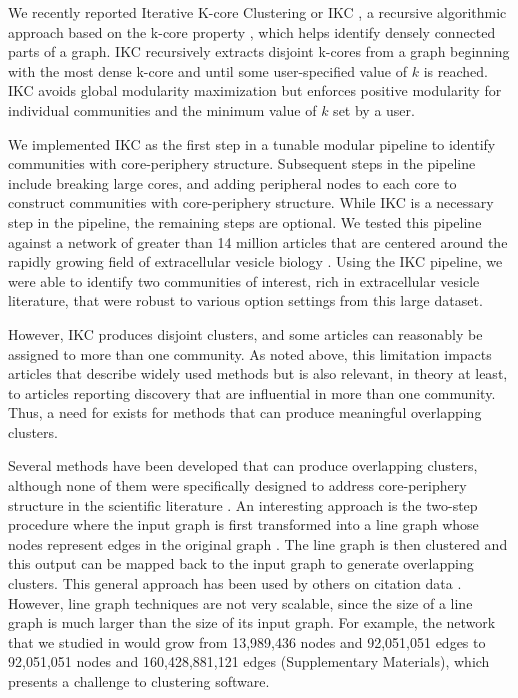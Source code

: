 \documentclass[12pt, oneside]{article}   	%
\begin{document}
We recently reported Iterative K-core Clustering or IKC \citep{Wedell2022}, a recursive algorithmic approach based on the k-core property \citep{Giatsidis2011,malliaros2019}, which helps identify densely connected parts of a graph. IKC recursively extracts disjoint k-cores from a graph beginning with the most dense  k-core and until some user-specified value of $k$ is reached. IKC avoids global modularity maximization \citep{lancichinetti2011limits} but enforces positive modularity for individual communities and the minimum value of $k$ set by a user. 

We implemented IKC as the first step in a tunable modular pipeline to identify communities with core-periphery structure. Subsequent steps in the pipeline include breaking large cores, and adding peripheral nodes to each core to construct communities with core-periphery structure. While IKC is a necessary step in the pipeline, the remaining steps are optional. We tested this pipeline against a network of greater than 14 million articles that are centered around the rapidly growing field of extracellular vesicle biology \citep{Wedell2022}. Using the IKC pipeline, we were able to identify two communities of interest, rich in extracellular vesicle literature, that were robust to various option settings \citep[Figures 5]{Wedell2022} from this large dataset.

However, IKC produces disjoint clusters, and some articles can reasonably be assigned to more than one community. 
As noted above, this limitation impacts articles that describe widely used methods but is also relevant, in theory at least, to articles reporting discovery that are influential in more than one community.  Thus, a need for exists for methods that can produce meaningful overlapping clusters. 

Several methods have been developed that can produce overlapping clusters, although none of them were specifically designed to address core-periphery structure in the scientific literature  \citep{Baumes2005,Palla2005,banerjee2005model,Cleuziou2008,Lancichinetti2009,Lu2012}. An interesting approach is the two-step procedure where the input graph is first transformed into a line graph whose nodes represent edges in the original graph \citep{Harary1960}.  The line graph is then clustered and this output can be mapped back to the input graph to generate overlapping clusters. This general approach has been used by others on citation data \citep{Evans2009,Havemann2021}. However, line graph  techniques are not very scalable, since the size of a line graph is much larger than the size of its input graph. For example, the network that we studied in \cite{Wedell2022} would grow from 13,989,436 nodes and 92,051,051 edges to 92,051,051 nodes and 160,428,881,121 edges (Supplementary Materials), which presents a challenge to clustering software.
 
\end{document}
